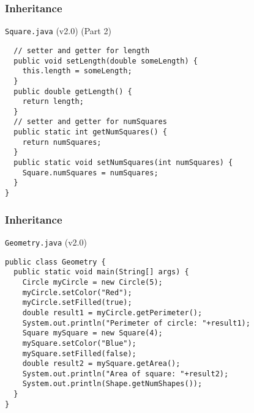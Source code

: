 \documentclass[10pt, compress]{beamer}
\begin{document}
\begin{frame}[fragile]
  \frametitle{Inheritance}
  \begin{block}{\texttt{Square.java} (v2.0) (Part 2)}
    \begin{verbatim}
  // setter and getter for length
  public void setLength(double someLength) {
    this.length = someLength;
  }
  public double getLength() {
    return length;
  }
  // setter and getter for numSquares
  public static int getNumSquares() {
    return numSquares;
  }
  public static void setNumSquares(int numSquares) {
    Square.numSquares = numSquares;
  }
}
    \end{verbatim}
  \end{block}
\end{frame}

\begin{frame}[fragile]
  \frametitle{Inheritance}
  \begin{block}{\texttt{Geometry.java} (v2.0)}
    \begin{verbatim}
public class Geometry {
  public static void main(String[] args) {
    Circle myCircle = new Circle(5);
    myCircle.setColor("Red");
    myCircle.setFilled(true);
    double result1 = myCircle.getPerimeter();
    System.out.println("Perimeter of circle: "+result1);
    Square mySquare = new Square(4);
    mySquare.setColor("Blue");
    mySquare.setFilled(false);
    double result2 = mySquare.getArea();
    System.out.println("Area of square: "+result2);
    System.out.println(Shape.getNumShapes());
  }
}
    \end{verbatim}
  \end{block}
\end{frame}
\end{document}
